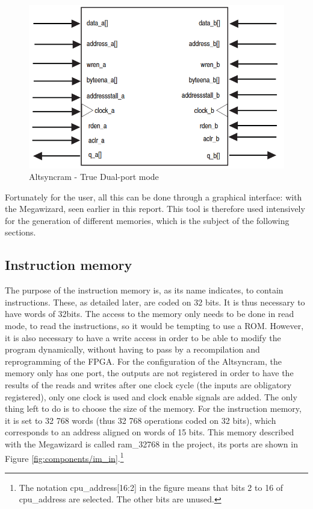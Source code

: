 \begin{figure}[H]
    \centering
    \includegraphics[scale=0.6]{Chapter3-CPU/res/altsyncram.PNG}
    \caption{Altsyncram - True Dual-port mode}
    \label{fig:memories/altsyncram}
\end{figure}

Fortunately for the user, all this can be done through a graphical interface: with the Megawizard, 
seen earlier in this report. This tool is therefore used intensively for the generation of 
different memories, which is the subject of the following sections.

\subsection{Instruction memory}

The purpose of the instruction memory is, as its name indicates, to contain instructions. These, as 
detailed later, are coded on 32 bits. It is thus necessary to have words of 32bits. The 
access to the memory only needs to be done in read mode, to read the instructions, so it would be tempting 
to use a ROM. However, it is also necessary to have a write access in order to be able to modify the 
program dynamically, without having to pass by a recompilation and reprogramming of the FPGA. 
For the configuration of the Altsyncram, the 
memory only has one port, the outputs are not registered in order to have the results of the reads 
and writes after one clock cycle (the inputs are obligatory registered), only one clock is used and 
clock enable signals are added. The only thing left to do is to choose the size of the memory. For 
the instruction memory, it is set to 32 768 words (thus 32 768 operations coded on 32 bits), which 
corresponds to an address aligned on words of 15 bits. This memory described with the Megawizard 
is called ram\_32768 in the project, its ports are shown in Figure \ref{fig:components/im_in}.\footnote{
The notation cpu\_address[16:2] in the figure means that bits 2 to 16 of cpu\_address are selected. 
The other bits are unused.}

